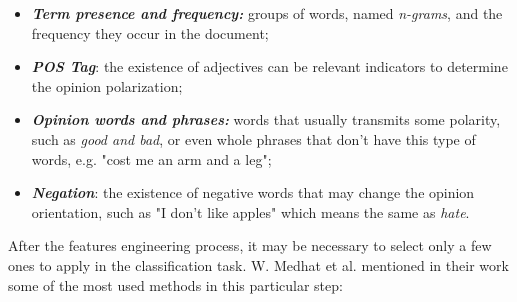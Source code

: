 \begin{itemize}
\item \textbf{\textit{Term presence and frequency:}} groups of words, named \textit{n-grams}, and the frequency they occur in the document;
\item \textbf{\textit{POS Tag}}: the existence of adjectives can be relevant indicators to determine the opinion polarization;
\item \textbf{\textit{Opinion words and phrases:}} words that usually transmits some polarity, such as \textit{good and bad}, or even whole phrases that don't have this type of words, e.g. "cost me an arm and a leg";
\item \textbf{\textit{Negation}}: the existence of negative words that may change the opinion orientation, such as "I don't like apples" which means the same as \textit{hate}. 
\end{itemize}

After the features engineering process, it may be necessary to select only a few ones to apply in the classification task. W. Medhat et al. \cite{kn:Medhat2014} mentioned in their work some of the most used methods in this particular step:

